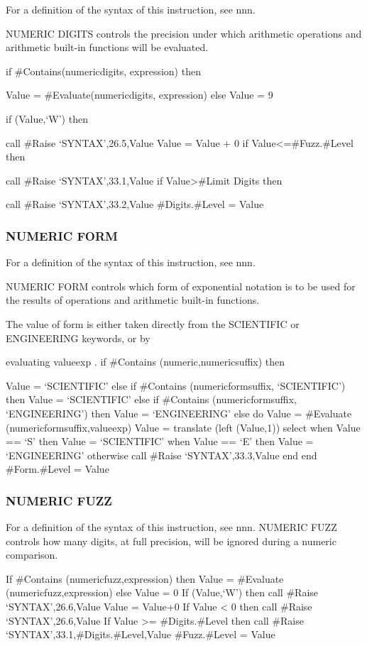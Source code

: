 For a definition of the syntax of this instruction, see nnn.

NUMERIC DIGITS controls the precision under which arithmetic operations
and arithmetic built-in functions will be evaluated.

if \#Contains(numericdigits, expression) then

Value = \#Evaluate(numericdigits, expression) else Value = 9

if \datatype(Value,`W') then

call \#Raise `SYNTAX',26.5,Value Value = Value + 0 if
Value\textless=\#Fuzz.\#Level then

call \#Raise `SYNTAX',33.1,Value if Value\textgreater\#Limit Digits then

call \#Raise `SYNTAX',33.2,Value \#Digits.\#Level = Value

\subsubsection{NUMERIC FORM}\label{numeric-form}

For a definition of the syntax of this instruction, see nnn.

NUMERIC FORM controls which form of exponential notation is to be used
for the results of operations and arithmetic built-in functions.

The value of form is either taken directly from the SCIENTIFIC or
ENGINEERING keywords, or by

evaluating valueexp . if \#Contains (numeric,numericsuffix) then

Value = `SCIENTIFIC' else if \#Contains (numericformsuffix,
`SCIENTIFIC') then Value = `SCIENTIFIC' else if \#Contains
(numericformsuffix, `ENGINEERING') then Value = `ENGINEERING' else do
Value = \#Evaluate (numericformsuffix,valueexp) Value = translate (left
(Value,1)) select when Value == `S' then Value = `SCIENTIFIC' when Value
== `E' then Value = `ENGINEERING' otherwise call \#Raise
`SYNTAX',33.3,Value end end \#Form.\#Level = Value

\subsubsection{NUMERIC FUZZ}\label{numeric-fuzz}

For a definition of the syntax of this instruction, see nnn. NUMERIC
FUZZ controls how many digits, at full precision, will be ignored during
a numeric comparison.

If \#Contains (numericfuzz,expression) then Value = \#Evaluate
(numericfuzz,expression) else Value = 0 If \datatype(Value,`W') then
call \#Raise `SYNTAX',26.6,Value Value = Value+0 If Value \textless{} 0
then call \#Raise `SYNTAX',26.6,Value If Value \textgreater=
\#Digits.\#Level then call \#Raise `SYNTAX',33.1,\#Digits.\#Level,Value
\#Fuzz.\#Level = Value

